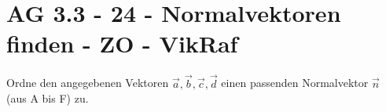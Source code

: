 \section{AG 3.3 - 24 - Normalvektoren finden  - ZO - VikRaf}

\begin{beispiel}[AG 3.3]{1}

Ordne den angegebenen Vektoren $\vec{a}, \vec{b}, \vec{c}, \vec{d}$ einen passenden Normalvektor $\vec{n}$ (aus A bis F) zu.


\end{beispiel}